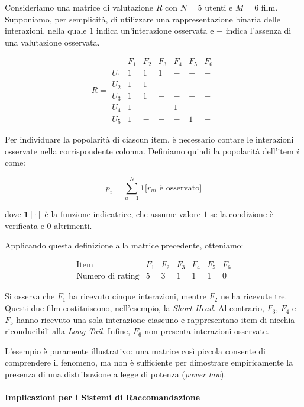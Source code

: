 Consideriamo una matrice di valutazione $R$ con $N=5$ utenti e $M=6$ film. Supponiamo, per semplicità, di utilizzare una rappresentazione binaria delle interazioni, nella quale $1$ indica un'interazione osservata e $-$ indica l'assenza di una valutazione osservata.

$$
R =
\begin{array}{c|cccccc}
 & F_1 & F_2 & F_3 & F_4 & F_5 & F_6 \\
\hline
U_1 & 1 & 1 & 1 & - & - & - \\
U_2 & 1 & 1 & - & - & - & - \\
U_3 & 1 & 1 & - & - & - & - \\
U_4 & 1 & - & - & 1 & - & - \\
U_5 & 1 & - & - & - & 1 & -
\end{array}
$$

Per individuare la popolarità di ciascun item, è necessario contare le interazioni osservate nella corrispondente colonna. Definiamo quindi la popolarità dell'item $i$ come:

$$
p_i = \sum_{u=1}^{N}
\mathbf{1}\bigl[r_{ui}\text{ è osservato}\bigr]
$$

dove $\mathbf{1}[\cdot]$ è la funzione indicatrice, che assume valore $1$ se la condizione è verificata e $0$ altrimenti.

Applicando questa definizione alla matrice precedente, otteniamo:

$$
\begin{array}{c|cccccc}
\text{Item} & F_1 & F_2 & F_3 & F_4 & F_5 & F_6 \\
\hline
\text{Numero di rating} & 5 & 3 & 1 & 1 & 1 & 0
\end{array}
$$

Si osserva che $F_1$ ha ricevuto cinque interazioni, mentre $F_2$ ne ha ricevute tre. Questi due film costituiscono, nell'esempio, la \textit{Short Head}. Al contrario, $F_3$, $F_4$ e $F_5$ hanno ricevuto una sola interazione ciascuno e rappresentano item di nicchia riconducibili alla \textit{Long Tail}. Infine, $F_6$ non presenta interazioni osservate.

L'esempio è puramente illustrativo: una matrice così piccola consente di comprendere il fenomeno, ma non è sufficiente per dimostrare empiricamente la presenza di una distribuzione a legge di potenza (\textit{power law}).


\paragraph{Implicazioni per i Sistemi di Raccomandazione}

